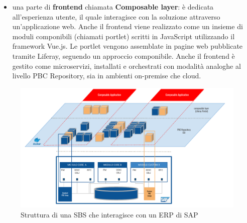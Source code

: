 \begin{itemize}
\begin{itemize}
            prezzi dei materiali PBC 0217 MATPRICELIST e l’unità di misura dei materiali PBC 0222 UNITOFMEASURE.
            In uno scenario on-premise (installazione presso il data-center del cliente), i
            microservizi sono orchestrati tramite Docker Compose. In uno scenario on-cloud, i
            microservizi vengono gestiti tramite Kubernetes\footnote{\url{https://kubernetes.io}}.
        \end{itemize}
    \item una parte di \textbf{frontend} chiamata \textbf{Composable layer}: è dedicata all’esperienza utente, il quale interagisce con
    la soluzione attraverso un'applicazione web.
    Anche il frontend viene realizzato come un insieme di moduli componibili (chiamati portlet)
    scritti in JavaScript utilizzando il framework Vue.js. Le portlet vengono assemblate in pagine web
    pubblicate tramite Liferay, seguendo un approccio componibile. Anche il frontend è gestito come
    microservizi, installati e orchestrati con modalità analoghe al livello \ac{PBC} Repository, sia in
    ambienti on-premise che cloud.
\end{itemize}

\begin{figure}
    \centering
    \includegraphics[width=\linewidth]{figures/architetturaSBS_SAP.pdf}
    \caption{Struttura di una SBS che interagisce con un ERP di SAP}
    \label{fig:sbs-sap}
\end{figure}

